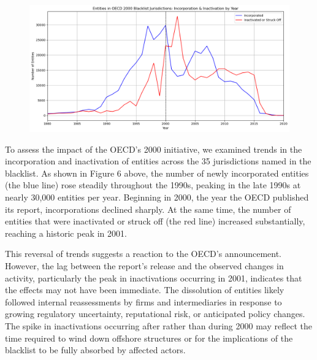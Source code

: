 \documentclass{article}
\begin{document}
\begin{figure}[H]
  \centering
    \caption{} 
  \label{fig:fig6}
  \includegraphics[width=\textwidth]{Figure 6.png}
\end{figure}

To assess the impact of the OECD’s 2000 initiative, we examined trends in the incorporation and inactivation of entities across the 35 jurisdictions named in the blacklist. As shown in Figure 6 above, the number of newly incorporated entities (the blue line) rose steadily throughout the 1990s, peaking in the late 1990s at nearly 30,000 entities per year. Beginning in 2000, the year the OECD published its report, incorporations declined sharply. At the same time, the number of entities that were inactivated or struck off (the red line) increased substantially, reaching a historic peak in 2001.

This reversal of trends suggests a reaction to the OECD’s announcement. However, the lag between the report’s release and the observed changes in activity, particularly the peak in inactivations occurring in 2001, indicates that the effects may not have been immediate. The dissolution of entities likely followed internal reassessments by firms and intermediaries in response to growing regulatory uncertainty, reputational risk, or anticipated policy changes. The spike in inactivations occurring after rather than during 2000 may reflect the time required to wind down offshore structures or for the implications of the blacklist to be fully absorbed by affected actors.
\end{document}
